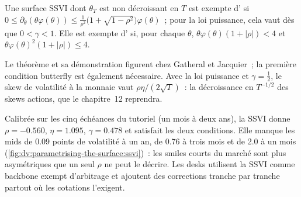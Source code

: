 \begin{theorem}\label{thm:dv:parametrising-the-surface:ssvi}
Une surface SSVI dont $\theta_T$ est non décroissant en $T$ est exempte d' si
$0\le\partial_\theta(\theta\varphi(\theta))\le\frac{1}{\rho^2}\bigl(1+\sqrt{1-\rho^2}\bigr)\varphi(\theta)$~;
pour la loi puissance, cela vaut dès que $0<\gamma<1$. Elle est exempte d' si, pour
chaque $\theta$, $\theta\varphi(\theta)(1+|\rho|)<4$ et $\theta\varphi(\theta)^2(1+|\rho|)\le4$.
\end{theorem}
\admitted

Le théorème et sa démonstration figurent chez Gatheral et Jacquier~; la première condition butterfly est également
nécessaire. Avec la loi puissance et $\gamma=\tfrac12$, le skew de volatilité à la monnaie vaut
$\rho\eta/(2\sqrt T)$~: la décroissance en $T^{-1/2}$ des skews actions, que le chapitre~12 reprendra.

\begin{example}\label{ex:dv:parametrising-the-surface:ssvi}
Calibrée sur les cinq échéances du tutoriel (un mois à deux ans), la SSVI donne $\rho=-0.560$,
$\eta=1.095$, $\gamma=0.478$ et satisfait les deux conditions. Elle manque les mids de 0.09
points de volatilité à un an, de 0.76 à trois mois et de 2.0 à un mois
(\cref{fig:dv:parametrising-the-surface:ssvi})~: les smiles courts du marché sont plus asymétriques que
un seul $\rho$ ne peut le décrire. Les desks utilisent la SSVI comme backbone exempt d'arbitrage et ajoutent des corrections tranche par tranche
partout où les cotations l'exigent.
\end{example}

